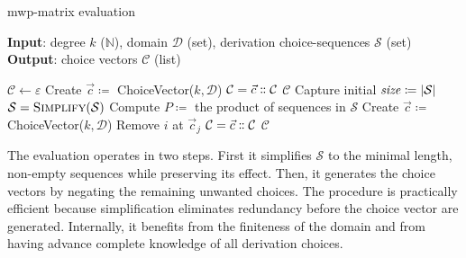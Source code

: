 \begin{algorithm}
    \caption{mwp-matrix evaluation}
    \label{alg:algo}
    \textbf{Input}:
    degree \(k\) (\(\mathbb{N}\)),
    domain \(\mathcal{D}\) (set),
    derivation choice-sequences \(\mathcal{S}\) (set)\\
    \textbf{Output}: choice vectors \(\mathcal{C}\) (list)
    \begin{algorithmic}[1]
        \State \(\mathcal{C} \gets \varepsilon \)
        \label{alg:step0}
            \State Create \(\vec{c} \coloneqq\) ChoiceVector(\(k, \mathcal{D}\))
            \State \(\mathcal{C} \gets \vec{c} \dblcolon\mathcal{C} \)
        \EndIf
        \State \Return \(\mathcal{C}\)\label{alg:step0end}
        \EndIf
        \Do \; Capture initial \(\text{\textit{size}} \coloneqq |\mathcal{S}|\)
        \State \(\mathcal{S} \gets \textsc{Simplify}(\mathcal{S})\)\label{alg:step1}
        \State Compute \(P \coloneqq\) the product of sequences in \(\mathcal{S}\)\label{alg:step2}
         
        \State Create \(\vec{c} \coloneqq\) ChoiceVector(\(k, \mathcal{D}\))
          
        \State Remove \(i\) at \(\vec{c}_j\)
        \EndFor
            \State \(\mathcal{C} \gets \vec{c} \dblcolon\mathcal{C} \)\label{alg:add}\label{alg:step2end}
        \EndIf
        \EndFor
        \State \Return \(\mathcal{C}\)
    \end{algorithmic}
\end{algorithm}

The evaluation operates in two steps.
First it simplifies \(\mathcal{S}\) to the minimal length, non-empty sequences while preserving its effect.
Then, it generates the choice vectors by negating the remaining unwanted choices.
The procedure is practically efficient because simplification eliminates redundancy before the choice vector are generated.
Internally, it benefits from the finiteness of the domain and from having advance complete knowledge of all derivation choices.

